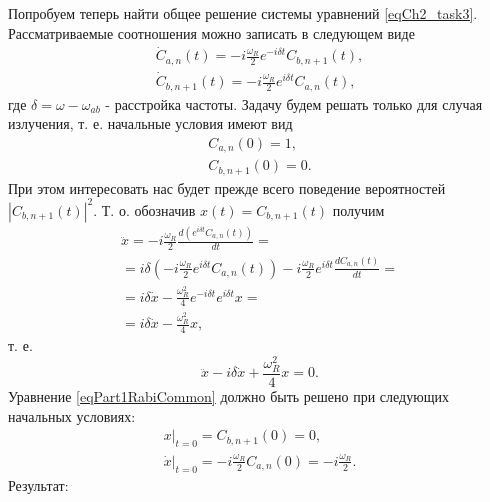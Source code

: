 Попробуем теперь найти общее решение системы уравнений
\eqref{eqCh2_task3}. Рассматриваемые соотношения можно записать в
следующем виде
\begin{eqnarray}
  {\dot C}_{a,n}\left(t\right) = -i \frac{\omega_R}{2} e^{-i \delta t} 
C_{b, n + 1}\left(t\right),
\nonumber \\
{\dot C}_{b, n + 1}\left(t\right) = -i \frac{\omega_R}{2} e^{i \delta t} 
C_{a, n}\left(t\right),
  \nonumber
\end{eqnarray}
где $\delta = \omega - \omega_{ab}$ - расстройка частоты.
Задачу будем решать только для случая излучения, т. е. начальные
условия имеют вид
\begin{eqnarray}
  C_{a,n}\left(0\right) = 1,
  \nonumber \\
  C_{b,n+1}\left(0\right) = 0.
  \nonumber
\end{eqnarray}
При этом интересовать нас будет прежде всего поведение вероятностей
$\left|C_{b, n + 1}\left(t\right)\right|^2$. Т. о.
обозначив $x\left(t\right) = C_{b,n+1}\left(t\right)$ получим
\begin{eqnarray}
  \ddot{x} =  -i \frac{\omega_R}{2} \frac{d \left(e^{i \delta t} 
    C_{a, n}\left(t\right)\right) }{d t} =
  \nonumber \\
  = i \delta \left(- i \frac{\omega_R}{2} e^{ i\delta t} 
  C_{a, n}\left(t\right) \right) -i \frac{\omega_R}{2} e^{i \delta t}
  \frac{d C_{a, n}\left(t\right)}{dt} =
  \nonumber \\
  = i \delta \dot{x} - \frac{\omega_R^2}{4} e^{-i \delta t} e^{i \delta t} x =
  \nonumber \\
  = i \delta \dot{x} - \frac{\omega_R^2}{4} x,
  \nonumber
\end{eqnarray}
т. е.
\begin{equation}
  \ddot{x} - i \delta \dot{x} + \frac{\omega_R^2}{4} x = 0.
  \label{eqPart1RabiCommon}
\end{equation}
Уравнение \eqref{eqPart1RabiCommon} должно быть решено при следующих
начальных условиях:
\begin{eqnarray}
  \left.x\right|_{t=0} = C_{b,n+1}\left(0\right) = 0,
  \nonumber \\
  \left.\dot{x}\right|_{t=0} = -i \frac{\omega_R}{2} C_{a,n}\left(0\right) =
  -i \frac{\omega_R}{2}.
  \nonumber
\end{eqnarray}
Результат:
